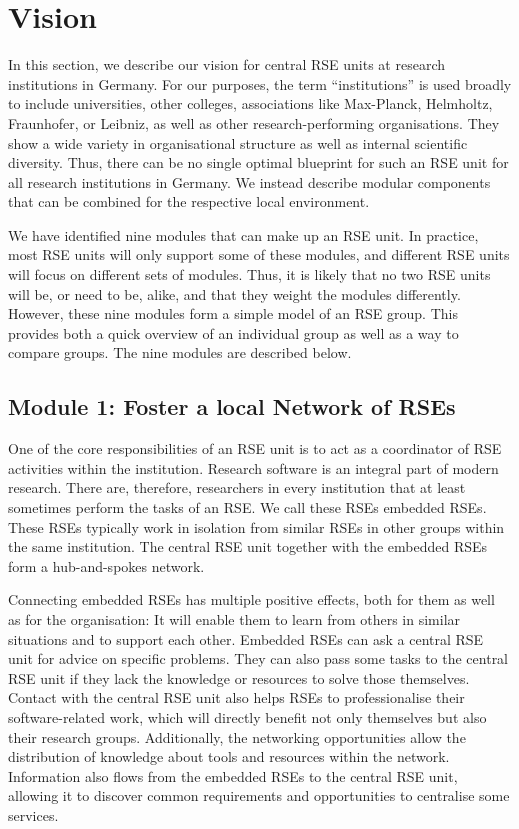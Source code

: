 \documentclass[a4paper]{article}
\begin{document}
\section{Vision}%
\label{sec:vision}

In this section, we describe our vision for central RSE units at research institutions in Germany.
For our purposes, the term “institutions” is used broadly to include universities, other colleges, associations like Max-Planck, Helmholtz, Fraunhofer, or Leibniz, as well as other research-performing organisations.
They show a wide variety in organisational structure as well as internal scientific diversity.
Thus, there can be no single optimal blueprint for such an RSE unit for all research institutions in Germany.
We instead describe modular components that can be combined for the respective local environment.

We have identified nine modules that can make up an RSE unit.
In practice, most RSE units will only support some of these modules, and different RSE units will focus on different sets of modules.
Thus, it is likely that no two RSE units will be, or need to be, alike, and that they weight the modules differently. 
However, these nine modules form a simple model of an RSE group.
This provides both a quick overview of an individual group as well as a way to compare groups.
The nine modules are described below.

\subsection{Module 1: Foster a local Network of RSEs}%
\label{sec:network}

One of the core responsibilities of an RSE unit is to act as a coordinator of RSE activities within the institution.
Research software is an integral part of modern research.
There are, therefore, researchers in every institution that at least sometimes perform the tasks of an RSE\@.
We call these RSEs embedded RSEs.
These RSEs typically work in isolation from similar RSEs in other groups within the same institution.
The central RSE unit together with the embedded RSEs form a hub-and-spokes network.

Connecting embedded RSEs has multiple positive effects, both for them as well as for the organisation:
It will enable them to learn from others in similar situations and to support each other.
Embedded RSEs can ask a central RSE unit for advice on specific problems.
They can also pass some tasks to the central RSE unit if they lack the knowledge or resources to solve those themselves.
Contact with the central RSE unit also helps RSEs to professionalise their software-related work, which will directly benefit not only themselves but also their research groups.
Additionally, the networking opportunities allow the distribution of knowledge about tools and resources within the network.
Information also flows from the embedded RSEs to the central RSE unit, allowing it to discover common requirements and opportunities to centralise some services.
\end{document}
